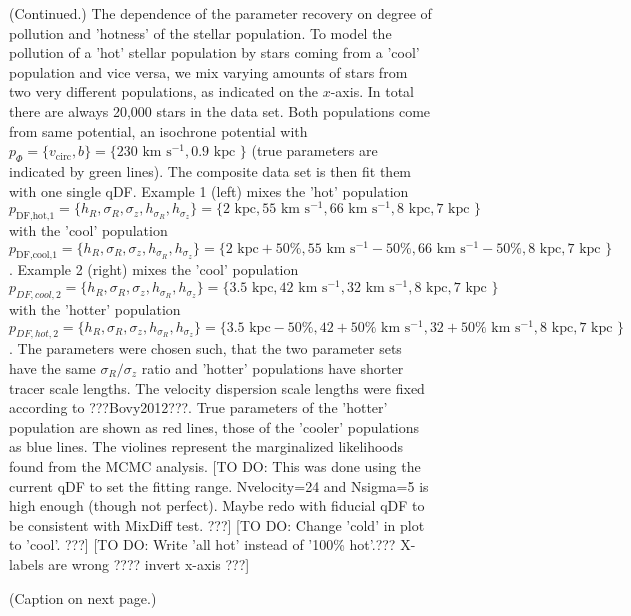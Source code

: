 \addtocounter{figure}{-1}
\begin{figure} [t!]
  \caption{(Continued.)  The dependence of the parameter recovery on degree of pollution and 'hotness' of the stellar population. To model the pollution of a 'hot' stellar population by stars coming from a 'cool' population and vice versa, we mix varying amounts of stars from two very different populations, as indicated on the $x$-axis. In total there are always 20,000 stars in the data set. Both populations come from same potential, an isochrone potential with $p_\Phi = \{v_\text{circ},b \}=\{230 \text{ km s$^{-1}$},0.9\text{ kpc } \}$ (true parameters are indicated by green lines). The composite data set is then fit them with one single qDF. Example 1 (left) mixes the 'hot' population $p_\text{DF,hot,1} = \{ h_R, \sigma_R, \sigma_z,h_{\sigma_R},h_{\sigma_z}\} =\{2 \text{ kpc}, 55 \text{ km s$^{-1}$}, 66 \text{ km s$^{-1}$}, 8 \text{ kpc}, 7 \text{ kpc }\} $ with the 'cool' population $p_\text{DF,cool,1} = \{ h_R, \sigma_R, \sigma_z,h_{\sigma_R},h_{\sigma_z}\} =\{2 \text{ kpc}+50\%, 55 \text{ km s$^{-1}$}-50\%, 66 \text{ km s$^{-1}$}-50\%, 8 \text{ kpc}, 7 \text{ kpc }\}$. Example 2 (right) mixes the 'cool' population $p_{DF,cool,2} = \{ h_R, \sigma_R, \sigma_z,h_{\sigma_R},h_{\sigma_z}\} =\{3.5 \text{ kpc}, 42 \text{ km s$^{-1}$}, 32 \text{ km s$^{-1}$}, 8 \text{ kpc}, 7 \text{ kpc }\} $ with the 'hotter' population $p_{DF,hot,2} = \{ h_R, \sigma_R, \sigma_z,h_{\sigma_R},h_{\sigma_z}\} =\{3.5 \text{ kpc}-50\%, 42+50\% \text{ km s$^{-1}$}, 32+50\% \text{ km s$^{-1}$}, 8 \text{ kpc}, 7 \text{ kpc }\} $. The parameters were chosen such, that the two parameter sets have the same $\sigma_R/\sigma_z$ ratio and 'hotter' populations have shorter tracer scale lengths. The velocity dispersion scale lengths were fixed according to ???Bovy2012???. True parameters of the 'hotter' population are shown as red lines, those of the 'cooler' populations as blue lines. The violines represent the marginalized likelihoods found from the MCMC analysis. [TO DO: This was done using the current qDF to set the fitting range. Nvelocity=24 and Nsigma=5 is high enough (though not perfect). Maybe redo with fiducial qDF to be consistent with MixDiff test. ???] [TO DO: Change 'cold' in plot to 'cool'. ???] [TO DO: Write 'all hot' instead of '100\% hot'.??? X-labels are wrong ???? invert x-axis ???]}
\end{figure}


\begin{figure}
\caption{(Caption on next page.)}
\label{fig:isoSphFlexMixDiff}
\end{figure}


